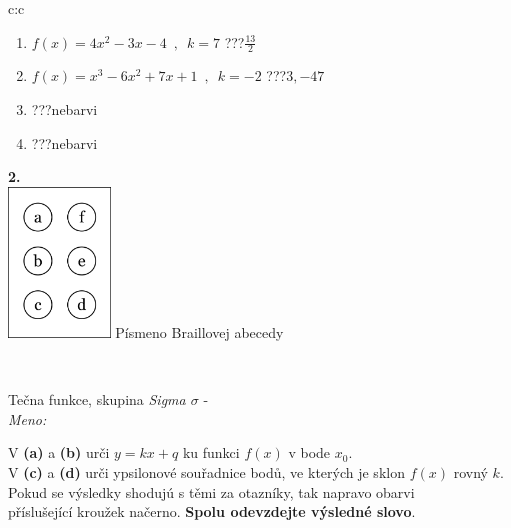 \documentclass[10pt]{report}
\begin{document}
\begin{tabular}{c:c}
\begin{minipage}[c][104.5mm][t]{0.5\linewidth}
\begin{center}
\begin{minipage}{0.79\linewidth}
\begin{center}
\begin{varwidth}{\linewidth}
\begin{enumerate}
\item $f(x)=4x^2-3x-4\enspace , \enspace k=7$\quad \dotfill\; ???\;\dotfill \quad $\frac{13}{2}$
\item $f(x)=x^3-6x^2+7x+1\enspace , \enspace k=-2$\quad \dotfill\; ???\;\dotfill \quad $3 , -47$
\item \quad \dotfill\; ???\;\dotfill \quad nebarvi
\item \quad \dotfill\; ???\;\dotfill \quad nebarvi
\end{enumerate}
\end{varwidth}
\end{center}
\end{minipage}
\begin{minipage}{0.20\linewidth}
\begin{center}
{\Huge\bfseries 2.} \\[2mm]
\includegraphics[height=40mm]{../images/braille.png}
{\small Písmeno Braillovej abecedy}
\end{center}
\end{minipage}
\end{center}
\end{minipage}
\\ \hdashline
\begin{minipage}[c][104.5mm][t]{0.5\linewidth}
\begin{center}
\vspace{7mm}
{\huge Tečna funkce, skupina \textit{Sigma $\sigma$} -}\\[5mm]
\textit{Meno:}\phantom{xxxxxxxxxxxxxxxxxxxxxxxxxxxxxxxxxxxxxxxxxxxxxxxxxxxxxxxxxxxxxxxxx}\\[5mm]
\begin{minipage}{0.95\linewidth}
\begin{center}
V \textbf{(a)} a \textbf{(b)} urči  $y = kx + q$ ku funkci $f(x)$ v bode $x_0$.\\V \textbf{(c)} a \textbf{(d)} urči ypsilonové souřadnice bodů, ve kterých je sklon $f(x)$ rovný $k$.\\Pokud se výsledky shodujú s těmi za otazníky, tak napravo obarvi\\příslušející kroužek načerno. \textbf{Spolu odevzdejte výsledné slovo}.

\end{center}
\end{minipage}
\end{center}
\end{minipage}
\end{tabular}
\end{document}
